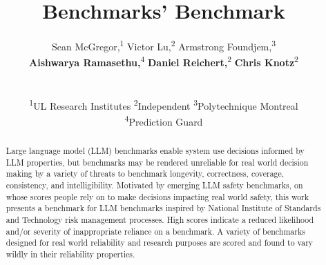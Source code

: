\documentclass{article}
\title{Benchmarks' Benchmark}
\author{%
  Sean McGregor,\textsuperscript{1}
  Victor Lu,\textsuperscript{2}
  Armstrong Foundjem,\textsuperscript{3}\\
  \textbf{Aishwarya Ramasethu,}\textsuperscript{4}
  \textbf{Daniel Reichert,}\textsuperscript{2}
  \textbf{Chris Knotz}\textsuperscript{2}\\
   \\
  \\
  \textsuperscript{1}UL Research Institutes \textsuperscript{2}Independent
\textsuperscript{3}Polytechnique Montreal
\\
\textsuperscript{4}Prediction Guard
}
\begin{document}
\maketitle

\begin{abstract}
Large language model (LLM) benchmarks enable system use decisions informed by LLM properties, but benchmarks may be rendered unreliable for real world decision making by a variety of threats to benchmark longevity, correctness, coverage, consistency, and intelligibility. Motivated by emerging LLM safety benchmarks, on whose scores people rely on to make decisions impacting real world safety, this work presents a benchmark for LLM benchmarks inspired by National Institute of Standards and Technology risk management processes. High scores indicate a reduced likelihood and/or severity of inappropriate reliance on a benchmark. A variety of benchmarks designed for real world reliability and research purposes are scored and found to vary wildly in their reliability properties.
\end{abstract}





\end{document}

